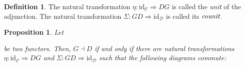 \documentclass{article}
\newcommand{\id}{\mathrm{id}}
\newcommand{\cat}{\mathcal{C}}
\newcommand{\catt}{\mathcal{D}}
\theoremstyle{plain}
\newtheorem{proposition}[theorem]{Proposition}
\theoremstyle{definition}
\newtheorem{definition}[theorem]{Definition}
\theoremstyle{remark}
\begin{document}
\begin{definition}
    The natural transformation $\eta : \id_\cat \Rightarrow DG$ is called the \emph{unit} of the adjunction. The natural transformation $\Sigma : GD \Rightarrow \id_\catt$ is called its $\emph{counit}$.
\end{definition}

\begin{proposition}
    Let  be two functors. Then, $G \dashv D$ if and only if there are natural transformations $\eta : \id_\cat \Rightarrow DG$ and $\Sigma : GD \Rightarrow \id_\catt$ such that the following diagrams commute:
    \begin{center}
    \end{center}
\end{proposition}
\end{document}
